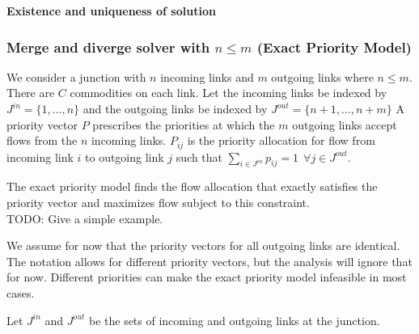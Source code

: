 \textbf{Existence and uniqueness of solution}

\subsubsection{Merge and diverge solver with $n \leq{m}$ (Exact Priority Model)} 

We consider a junction with $n$ incoming links and $m$ outgoing links where $n \leq{m}$. There are $C$ commodities on each link. Let the incoming links be indexed by $J^{in} = \{1, \dots, n\}$ and the outgoing links be indexed by $J^{out} = \{n+1, \dots, n+m\}$ A priority vector $P$ prescribes the priorities at which the $m$ outgoing links accept flows from the $n$ incoming links. $P_{ij}$ is the priority allocation for flow from incoming link $i$ to outgoing link $j$ such that $\sum_{i\in J^{in}} p_{ij} = 1 \ \ \forall j\in J^{out}$.

\begin{remark}
The exact priority model finds the flow allocation that exactly satisfies the priority vector and maximizes flow subject to this constraint. \\

\noindent TODO: Give a simple example.
\end{remark}

\begin{remark}
We assume for now that the priority vectors for all outgoing links are identical. The notation allows for different priority vectors, but the analysis will ignore that for now. Different priorities can make the exact priority model infeasible in most cases.
\end{remark}

Let $J^{in}$ and $J^{out}$ be the sets of incoming and outgoing links at the junction.

